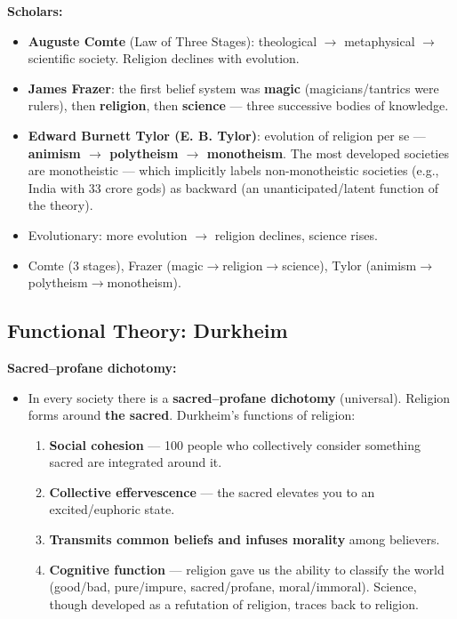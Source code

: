 \begin{DataFact}
\textbf{Scholars:}
\begin{itemize}
\item \textbf{Auguste Comte} (Law of Three Stages): theological $\rightarrow$ metaphysical $\rightarrow$ scientific society. Religion declines with evolution.
\item \textbf{James Frazer}: the first belief system was \textbf{magic} (magicians/tantrics were rulers), then \textbf{religion}, then \textbf{science} --- three successive bodies of knowledge.
\item \textbf{Edward Burnett Tylor (E. B. Tylor)}: evolution of religion per se --- \textbf{animism $\rightarrow$ polytheism $\rightarrow$ monotheism}. The most developed societies are monotheistic --- which implicitly labels non-monotheistic societies (e.g., India with 33 crore gods) as backward (an unanticipated/latent function of the theory).
\end{itemize}
\end{DataFact}

\begin{QuickRevision}
\begin{itemize}
\item Evolutionary: more evolution $\rightarrow$ religion declines, science rises.
\item Comte (3 stages), Frazer (magic$\rightarrow$religion$\rightarrow$science), Tylor (animism$\rightarrow$polytheism$\rightarrow$monotheism).
\end{itemize}
\end{QuickRevision}

\sectiondivider

\subsection{Functional Theory: Durkheim}

\begin{KeyConcept}
\textbf{Sacred--profane dichotomy:}
\begin{itemize}
\item In every society there is a \textbf{sacred--profane dichotomy} (universal). Religion forms around \textbf{the sacred}. Durkheim's functions of religion:
\begin{enumerate}
\item \textbf{Social cohesion} --- 100 people who collectively consider something sacred are integrated around it.
\item \textbf{Collective effervescence} --- the sacred elevates you to an excited/euphoric state.
\item \textbf{Transmits common beliefs and infuses morality} among believers.
\item \textbf{Cognitive function} --- religion gave us the ability to classify the world (good/bad, pure/impure, sacred/profane, moral/immoral). Science, though developed as a refutation of religion, traces back to religion.
\end{enumerate}
\end{itemize}
\end{KeyConcept}

